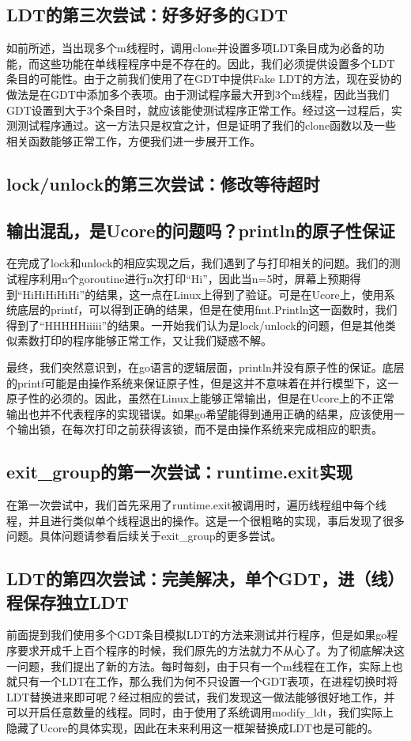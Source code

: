 \documentclass{article}
\begin{document}
\subsection{LDT的第三次尝试：好多好多的GDT}
如前所述，当出现多个m线程时，调用clone并设置多项LDT条目成为必备的功能，而这些功能在单线程程序中是不存在的。因此，我们必须提供设置多个LDT条目的可能性。由于之前我们使用了在GDT中提供Fake LDT的方法，现在妥协的做法是在GDT中添加多个表项。由于测试程序最大开到3个m线程，因此当我们GDT设置到大于3个条目时，就应该能使测试程序正常工作。经过这一过程后，实测测试程序通过。这一方法只是权宜之计，但是证明了我们的clone函数以及一些相关函数能够正常工作，方便我们进一步展开工作。

\subsection{lock/unlock的第三次尝试：修改等待超时}

\subsection{输出混乱，是Ucore的问题吗？println的原子性保证}
在完成了lock和unlock的相应实现之后，我们遇到了与打印相关的问题。我们的测试程序利用n个goroutine进行n次打印“Hi”，因此当n=5时，屏幕上预期得到“HiHiHiHiHi”的结果，这一点在Linux上得到了验证。可是在Ucore上，使用系统底层的printf，可以得到正确的结果，但是在使用fmt.Println这一函数时，我们得到了“HHHHHiiiii”的结果。一开始我们认为是lock/unlock的问题，但是其他类似素数打印的程序能够正常工作，又让我们疑惑不解。

最终，我们突然意识到，在go语言的逻辑层面，println并没有原子性的保证。底层的printf可能是由操作系统来保证原子性，但是这并不意味着在并行模型下，这一原子性的必须的。因此，虽然在Linux上能够正常输出，但是在Ucore上的不正常输出也并不代表程序的实现错误。如果go希望能得到通用正确的结果，应该使用一个输出锁，在每次打印之前获得该锁，而不是由操作系统来完成相应的职责。

\subsection{exit\_group的第一次尝试：runtime.exit实现}
在第一次尝试中，我们首先采用了runtime.exit被调用时，遍历线程组中每个线程，并且进行类似单个线程退出的操作。这是一个很粗略的实现，事后发现了很多问题。具体问题请参看后续关于exit\_group的更多尝试。

\subsection{LDT的第四次尝试：完美解决，单个GDT，进（线）程保存独立LDT}
前面提到我们使用多个GDT条目模拟LDT的方法来测试并行程序，但是如果go程序要求开成千上百个程序的时候，我们原先的方法就力不从心了。为了彻底解决这一问题，我们提出了新的方法。每时每刻，由于只有一个m线程在工作，实际上也就只有一个LDT在工作，那么我们为何不只设置一个GDT表项，在进程切换时将LDT替换进来即可呢？经过相应的尝试，我们发现这一做法能够很好地工作，并可以开启任意数量的线程。同时，由于使用了系统调用modify\_ldt，我们实际上隐藏了Ucore的具体实现，因此在未来利用这一框架替换成LDT也是可能的。
\end{document}
